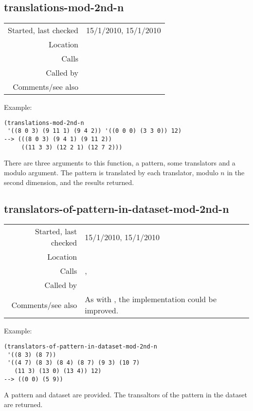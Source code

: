 \subsection*{translations-mod-2nd-n}\label{fun:translations-mod-2nd-n}

\vspace{0.3cm}
\begin{tabular}{r|p{8cm}}
Started, last checked & 15/1/2010, 15/1/2010 \\
Location & \nameref{sec:structural-induction-mod} \\
Calls & \nameref{fun:translation-mod-2nd-n} \\
Called by & \\
Comments/see also & \nameref{fun:translations}
\end{tabular}

\vspace{0.5cm}
\noindent Example:
\begin{verbatim}
(translations-mod-2nd-n
 '((8 0 3) (9 11 1) (9 4 2)) '((0 0 0) (3 3 0)) 12)
--> (((8 0 3) (9 4 1) (9 11 2))
     ((11 3 3) (12 2 1) (12 7 2)))
\end{verbatim}

\noindent There are three arguments to this function,
a pattern, some translators and a modulo argument. The
pattern is translated by each translator, modulo $n$
in the second dimension, and the results returned.


\subsection*{translators-of-pattern-in-dataset-mod-2nd-n}\label{fun:translators-of-pattern-in-dataset-mod-2nd-n}

\vspace{0.3cm}
\begin{tabular}{r|p{8cm}}
Started, last checked & 15/1/2010, 15/1/2010 \\
Location & \nameref{sec:structural-induction-mod} \\
Calls & \nameref{fun:check-potential-translators-mod-2nd-n}, \nameref{fun:subtract-list-from-each-list-mod-2nd-n} \\
Called by & \\
Comments/see also & As with \nameref{fun:translators-of-pattern-in-dataset}, the implementation could be improved.
\end{tabular}

\vspace{0.5cm}
\noindent Example:
\begin{verbatim}
(translators-of-pattern-in-dataset-mod-2nd-n
 '((8 3) (8 7))
 '((4 7) (8 3) (8 4) (8 7) (9 3) (10 7)
   (11 3) (13 0) (13 4)) 12)
--> ((0 0) (5 9))
\end{verbatim}

\noindent A pattern and dataset are provided. The
transaltors of the pattern in the dataset are
returned.


















